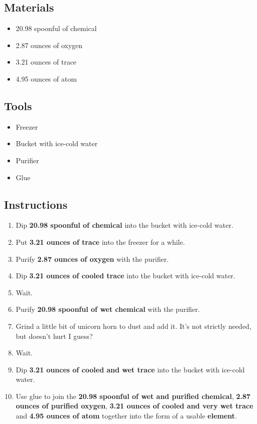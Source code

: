 \documentclass{article}
\begin{document}
\subsection{Materials}\begin{itemize}
\item 
20.98 spoonful of chemical
\item 
2.87 ounces of oxygen
\item 
3.21 ounces of trace
\item 
4.95 ounces of atom
\end{itemize}
\subsection{Tools}\begin{itemize}
\item 
Freezer
\item 
Bucket with ice-cold water
\item 
Purifier
\item 
Glue
\end{itemize}
\subsection{Instructions}\begin{enumerate}
\item 
Dip \textbf{20.98 spoonful of chemical} into the bucket with ice-cold water.
\item 
Put \textbf{3.21 ounces of trace} into the freezer for a while.
\item 
Purify \textbf{2.87 ounces of oxygen} with the purifier.
\item 
Dip \textbf{3.21 ounces of cooled trace} into the bucket with ice-cold water.
\item 
Wait.
\item 
Purify \textbf{20.98 spoonful of wet chemical} with the purifier.
\item 
Grind a little bit of unicorn horn to dust and add it. It's not strictly needed, but doesn't hurt I guess?
\item 
Wait.
\item 
Dip \textbf{3.21 ounces of cooled and wet trace} into the bucket with ice-cold water.
\item 
Use glue to join the \textbf{20.98 spoonful of wet and purified chemical}, \textbf{2.87 ounces of purified oxygen}, \textbf{3.21 ounces of cooled and very wet trace} and \textbf{4.95 ounces of atom} together into the form of a usable \textbf{element}.
\end{enumerate}
\newpage
\end{document}
